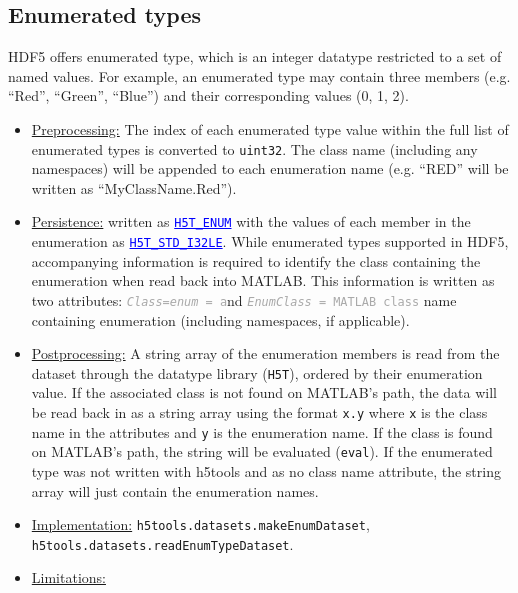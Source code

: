 \documentclass[11pt]{exam}
\newcommand\myurl[1]{\textcolor{blue}{\underline{#1}}}
\newcommand\hdftype[1]{\texttt{\myurl{#1}}}
\newcommand\myatt[2]{\textcolor{darkgray}{\texttt{\textit{#1} = #2}}}
\begin{document}
		\subsection{Enumerated types}
		\noindent HDF5 offers enumerated type, which is an integer datatype restricted to a set of named values. For example, an enumerated type may contain three members (e.g. ``Red'', ``Green'', ``Blue'') and their corresponding values (0, 1, 2).
		\begin{itemize}
			\item \underline{Preprocessing:} The index of each enumerated type value within the full list of enumerated types is converted to \texttt{uint32}. The class name (including any namespaces) will be appended to each enumeration name (e.g. ``RED'' will be written as ``MyClassName.Red'').
			\item \underline{Persistence:} written as \myurl{\texttt{H5T\_ENUM}} with the values of each member in the enumeration as \hdftype{H5T\_STD\_I32LE}. While enumerated types supported in HDF5, accompanying information is required to identify the class containing the enumeration when read back into MATLAB. This information is written as two attributes: \myatt{Class=enum} and \myatt{EnumClass}{MATLAB class} name containing enumeration (including namespaces, if applicable).
			\item \underline{Postprocessing:} A string array of the enumeration members is read from the dataset through the datatype library (\texttt{H5T}), ordered by their enumeration value. If the associated class is not found on MATLAB's path, the data will be read back in as a string array using the format \texttt{x.y} where \texttt{x} is the class name in the attributes and \texttt{y} is the enumeration name. If the class is found on MATLAB's path, the string will be evaluated (\texttt{eval}). If the enumerated type was not written with h5tools and as no class name attribute, the string array will just contain the enumeration names. %
			\item \underline{Implementation:} \texttt{h5tools.datasets.makeEnumDataset}, \texttt{h5tools.datasets.readEnumTypeDataset}.
			\item \underline{Limitations:} 
		\end{itemize}
		
\end{document}
